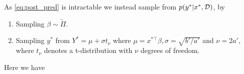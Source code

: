 As \eqref{eq:post_pred} is intractable we instead sample from $p(y^\ast | x^\ast, \mathcal{D})$, by
\begin{enumerate}
    \itemsep0em
    \item Sampling $\beta \sim \tilde{\Pi}$.
    \item Sampling $y^\ast$ from $Y^\ast = \mu + \sigma t_\nu$ where $\mu = x^{\ast \top} \beta, \sigma = \sqrt{b'/a'}$ and $\nu = 2a'$, where $t_\nu$ denotes a t-distribution with $\nu$ degrees of freedom.
\end{enumerate}
Here we have 

